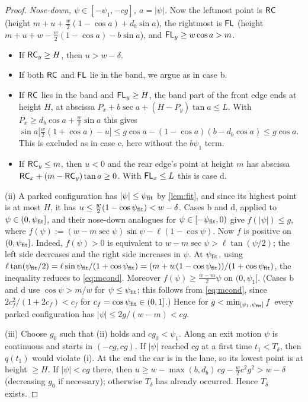 \begin{proof}
\emph{Nose-down, $\psi\in[-\psi_1,-cg]$, $a=|\psi|$.}
Now the leftmost point is $\mathsf{RC}$ (height $m+u+\tfrac w2(1-\cos a)+d_b\sin a$), the rightmost is $\mathsf{FL}$ (height $m+u+w-\tfrac w2(1-\cos a)-b\sin a$), and $\mathsf{FL}_y\ge w\cos a>m$.
\begin{itemize}[nosep]
\item If $\mathsf{RC}_y\ge H$, then $u>w-\delta$.
\item If both $\mathsf{RC}$ and $\mathsf{FL}$ lie in the band, we argue as in case b.
\item If $\mathsf{RC}$ lies in the band and $\mathsf{FL}_y\ge H$, the band part of the front edge ends at height $H$, at abscissa $P_x+b\sec a+(H-P_y)\tan a\le L$.
With $P_x\ge d_b\cos a+\tfrac w2\sin a$ this gives $\sin a\big[\tfrac w2(1+\cos a)-u\big]\le g\cos a-(1-\cos a)(b-d_b\cos a)\le g\cos a$.
This is excluded as in case c, here without the $b\psi_1$ term.
\item If $\mathsf{RC}_y\le m$, then $u<0$ and the rear edge's point at height $m$ has abscissa $\mathsf{RC}_x+(m-\mathsf{RC}_y)\tan a\ge0$.
With $\mathsf{FL}_x\le L$ this is case d.
\end{itemize}

(ii) A parked configuration has $|\psi|\le\psi_{\rm fit}$ by \cref{lem:fit}, and since its highest point is at most $H$, it has $u\le\frac w2(1-\cos\psi_{\rm fit})<w-\delta$.
Cases b and d, applied to $\psi\in(0,\psi_{\rm fit}]$, and their nose-down analogues for $\psi\in[-\psi_{\rm fit},0)$ give $f(|\psi|)\le g$, where $f(\psi):=(w-m\sec\psi)\sin\psi-\ell(1-\cos\psi)$.
Now $f$ is positive on $(0,\psi_{\rm fit}]$.
Indeed, $f(\psi)>0$ is equivalent to $w-m\sec\psi>\ell\tan(\psi/2)$; the left side decreases and the right side increases in $\psi$.
At $\psi_{\rm fit}$, using $\ell\tan(\psi_{\rm fit}/2)=\ell\sin\psi_{\rm fit}/(1+\cos\psi_{\rm fit})=(m+w(1-\cos\psi_{\rm fit}))/(1+\cos\psi_{\rm fit})$, the inequality reduces to \eqref{eq:mcond}.
Moreover $f(\psi)\ge\frac{w-m}2\psi$ on $(0,\psi_1]$.
(Cases b and d use $\cos\psi>m/w$ for $\psi\le\psi_{\rm fit}$; this follows from \eqref{eq:mcond}, since $2c_f^2/(1+2c_f)<c_f$ for $c_f=\cos\psi_{\rm fit}\in(0,1]$.)
Hence for $g<\min_{[\psi_1,\psi_{\rm fit}]}f$ every parked configuration has $|\psi|\le 2g/(w-m)<cg$.

(iii) Choose $g_0$ such that (ii) holds and $cg_0<\psi_1$.
Along an exit motion $\psi$ is continuous and starts in $(-cg,cg)$.
If $|\psi|$ reached $cg$ at a first time $t_1<T_\delta$, then $q(t_1)$ would violate (i).
At the end the car is in the lane, so its lowest point is at height $\ge H$.
If $|\psi|<cg$ there, then $u\ge w-\max(b,d_b)\,cg-\tfrac w2c^2g^2>w-\delta$ (decreasing $g_0$ if necessary); otherwise $T_\delta$ has already occurred.
Hence $T_\delta$ exists.
\end{proof}

